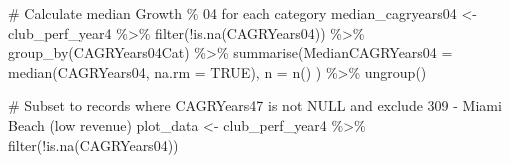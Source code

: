 \documentclass[
  letterpaper,
  oneside,
  11pt]{article}
\newenvironment{Shaded}{\begin{snugshade}}{\end{snugshade}}
\newcommand{\AttributeTok}[1]{\textcolor[rgb]{0.40,0.45,0.13}{#1}}
\newcommand{\CommentTok}[1]{\textcolor[rgb]{0.37,0.37,0.37}{#1}}
\newcommand{\ConstantTok}[1]{\textcolor[rgb]{0.56,0.35,0.01}{#1}}
\newcommand{\FunctionTok}[1]{\textcolor[rgb]{0.28,0.35,0.67}{#1}}
\newcommand{\NormalTok}[1]{\textcolor[rgb]{0.00,0.23,0.31}{#1}}
\newcommand{\OtherTok}[1]{\textcolor[rgb]{0.00,0.23,0.31}{#1}}
\newcommand{\SpecialCharTok}[1]{\textcolor[rgb]{0.37,0.37,0.37}{#1}}
\begin{document}
\begin{Shaded}
\begin{Highlighting}[]
\CommentTok{\# Calculate median Growth \% 04 for each category}
\NormalTok{median\_cagryears04 }\OtherTok{\textless{}{-}}\NormalTok{ club\_perf\_year4 }\SpecialCharTok{\%\textgreater{}\%}
  \FunctionTok{filter}\NormalTok{(}\SpecialCharTok{!}\FunctionTok{is.na}\NormalTok{(CAGRYears04)) }\SpecialCharTok{\%\textgreater{}\%}
  \FunctionTok{group\_by}\NormalTok{(CAGRYears04Cat) }\SpecialCharTok{\%\textgreater{}\%}
  \FunctionTok{summarise}\NormalTok{(}\AttributeTok{MedianCAGRYears04 =} \FunctionTok{median}\NormalTok{(CAGRYears04, }\AttributeTok{na.rm =} \ConstantTok{TRUE}\NormalTok{),}
            \AttributeTok{n =} \FunctionTok{n}\NormalTok{()}
\NormalTok{            ) }\SpecialCharTok{\%\textgreater{}\%}
  \FunctionTok{ungroup}\NormalTok{()}

\CommentTok{\# Subset to records where CAGRYears47 is not NULL and exclude 309 {-} Miami Beach (low revenue)}
\NormalTok{plot\_data }\OtherTok{\textless{}{-}}\NormalTok{ club\_perf\_year4 }\SpecialCharTok{\%\textgreater{}\%}
  \FunctionTok{filter}\NormalTok{(}\SpecialCharTok{!}\FunctionTok{is.na}\NormalTok{(CAGRYears04))}


\end{Highlighting}
\end{Shaded}
\end{document}
